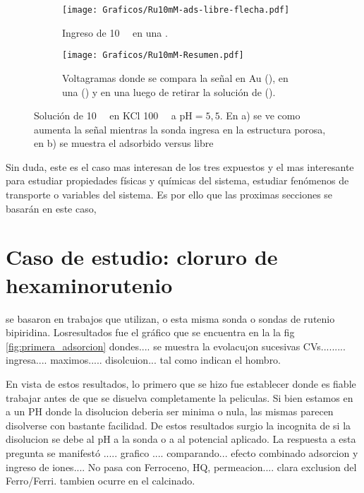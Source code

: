 			\begin{figure}[ht!]
				\begin{subfigure}[t]{0.495\textwidth}
				\texttt{[image: Graficos/Ru10mM-ads-libre-flecha.pdf]}
		        \caption{Ingreso de \aminorutenio\space \SI{10}{\milli\Molar} en una \pdmF.}
		        \label{fig:Ru10mM_ingreso}
		      	\end{subfigure}
		      	\begin{subfigure}[t]{0.495\textwidth}
				\texttt{[image: Graficos/Ru10mM-Resumen.pdf]}
		        \caption{Voltagramas donde se compara la señal en Au (\usebox{\rojo}), en una \pdmF\space(\usebox{\oliva}) y en una \pdmF\space luego de retirar la solución de \aminorutenio (\usebox{\azul}).}
		        \label{fig:Ru10mM-resumen}
		      	\end{subfigure}
		      	\caption[Adsorción de sonda positiva en \pdm]{Solución de \aminorutenio\space \SI{10}{\milli\Molar} en KCl \SI{100}{\milli\Molar} a $\text{pH}=5,5$. En a) se ve como aumenta la señal mientras la sonda ingresa en la estructura porosa, en b) se muestra el adsorbido versus libre}
		      	\label{fig:Ru10mM}
		      	\end{figure}


	Sin duda,  este es el caso mas interesan de los tres expuestos y el mas interesante para estudiar propiedades físicas y químicas del sistema, estudiar fenómenos de transporte o variables del sistema. Es por ello que las proximas secciones se basarán en este caso,
 	      	      		      	

	\section{Caso de estudio: cloruro de hexaminorutenio}
		


	se basaron en trabajos que utilizan, o esta misma sonda\cite{} o sondas de rutenio bipiridina. Losresultados fue el gráfico  que se encuentra en la la fig \ref{fig:primera_adsorcion} dondes.... se muestra la evolacu¡on sucesivas CVs......... ingresa.... maximos..... disolcuion... tal como indican el hombro.

			
	En vista de estos resultados, lo primero que se hizo fue establecer donde es fiable trabajar antes de que se disuelva completamente la peliculas. Si bien estamos en a un PH donde la disolucion deberia ser minima o nula, las mismas parecen disolverse con bastante facilidad. De estos resultados surgio la incognita de si la disolucion se debe al pH a la sonda o a al potencial aplicado. La respuesta a esta pregunta se manifestó ..... grafico .... comparando... efecto combinado adsorcion y ingreso de iones.... No pasa con Ferroceno, HQ, permeacion.... clara exclusion del Ferro/Ferri. tambien ocurre en el calcinado.

